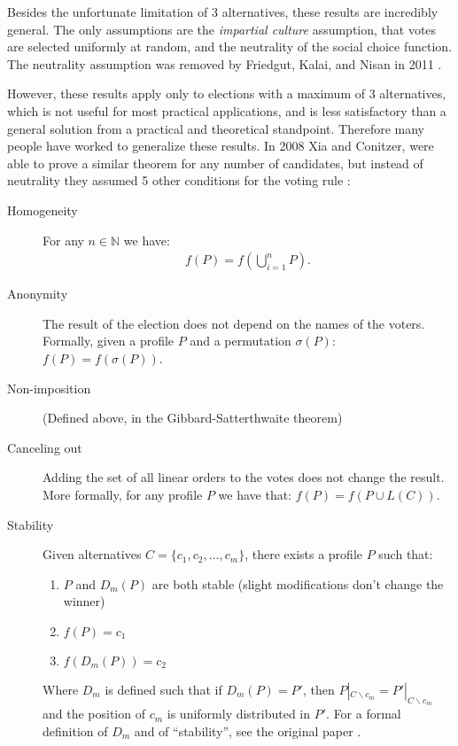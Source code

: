 	Besides the unfortunate limitation of 3 alternatives, these results are incredibly general. The only assumptions are the \emph{impartial culture} assumption, that votes are selected uniformly at random, and the neutrality of the social choice function. The neutrality assumption was removed by Friedgut, Kalai, and Nisan in 2011 \cite{friedgut2011quantitative}.

	However, these results apply only to elections with a maximum of 3 alternatives, which is not useful for most practical applications, and is less satisfactory than a general solution from a practical and theoretical standpoint. Therefore many people have worked to generalize these results. In 2008 Xia and Conitzer, were able to prove a similar theorem for any number of candidates, but instead of neutrality they assumed 5 other conditions for the voting rule \cite{xia2008sufficient}:

	\begin{description}
		\item[Homogeneity] For any $n \in \mathbb{N}$ we have:
			\begin{align*}
				f(P) = f\left(\bigcup_{i=1}^n P\right).
			\end{align*}
		\item[Anonymity] The result of the election does not depend on the names of the voters. Formally, given a profile $P$ and a permutation $\sigma(P)$: $f(P) = f(\sigma(P))$.
		\item[Non-imposition] (Defined above, in the Gibbard-Satterthwaite theorem)
		\item[Canceling out] Adding the set of all linear orders to the votes does not change the result. More formally, for any profile $P$ we have that: $f(P) = f(P \cup L(C))$.
		\item[Stability] Given alternatives $C = \{c_1, c_2, \ldots, c_m\}$, there exists a profile $P$ such that:
			\begin{enumerate}
				\item $P$ and $D_{m}(P)$ are both stable (slight modifications don't change the winner)
				\item $f(P) = c_1$
				\item $f(D_{m}(P)) = c_2$
			\end{enumerate}
			Where $D_m$ is defined such that if $D_m(P) = P'$, then $P|_{C \backslash c_m} = P'|_{C \backslash c_m}$ and the position of $c_m$ is uniformly distributed in $P'$. For a formal definition of $D_m$ and of ``stability'', see the original paper \cite{xia2008sufficient}.
	\end{description}

